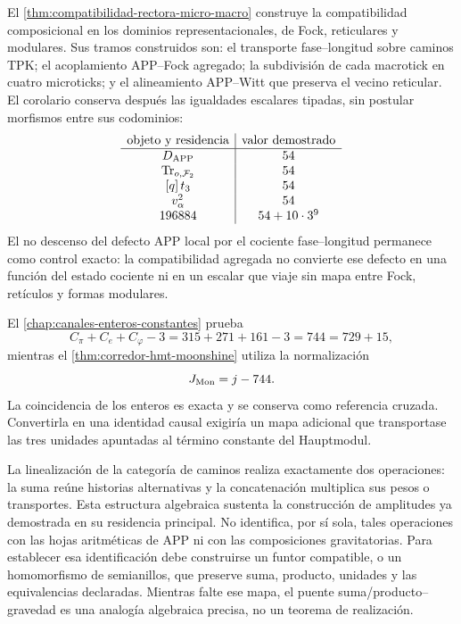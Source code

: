 El \cref{thm:compatibilidad-rectora-micro-macro} construye la compatibilidad
composicional en los dominios representacionales, de Fock, reticulares y
modulares. Sus tramos construidos son: el transporte fase--longitud sobre
caminos TPK; el acoplamiento APP--Fock agregado; la subdivisión de cada
macrotick en cuatro microticks; y el alineamiento APP--Witt que preserva el
vecino reticular. El corolario conserva después las igualdades escalares
tipadas, sin postular morfismos entre sus codominios:
\[
\begin{array}{c|c}
\text{objeto y residencia}&\text{valor demostrado}\\ \hline
D_{\rm APP}&54\\
\operatorname{Tr}_{o,\mathcal F_2}&54\\
\lbrack q\rbrack\,t_3&54\\
v_\alpha^2&54\\
196884&54+10\cdot3^9
\end{array}
\]
El no descenso del defecto APP local por el cociente fase--longitud permanece
como control exacto: la compatibilidad agregada no convierte ese defecto en
una función del estado cociente ni en un escalar que viaje sin mapa entre
Fock, retículos y formas modulares.

\begin{remark}[Normalización \(744\)]
El \cref{chap:canales-enteros-constantes} prueba
\[
 C_\pi+C_e+C_\varphi-3
 =315+271+161-3
 =744
 =729+15,
\]
mientras el \cref{thm:corredor-hmt-moonshine} utiliza la normalización
\[
 J_{\rm Mon}=j-744.
\]
La coincidencia de los enteros es exacta y se conserva como referencia
cruzada. Convertirla en una identidad causal exigiría un mapa adicional que
transportase las tres unidades apuntadas al término constante del
Hauptmodul.
\end{remark}

\begin{remark}
La linealización de la categoría de caminos realiza exactamente dos
operaciones: la suma reúne historias alternativas y la concatenación
multiplica sus pesos o transportes. Esta estructura algebraica sustenta la
construcción de amplitudes ya demostrada en su residencia principal. No
identifica, por sí sola, tales operaciones con las hojas aritméticas de APP
ni con las composiciones gravitatorias. Para establecer esa identificación
debe construirse un funtor compatible, o un homomorfismo de semianillos, que
preserve suma, producto, unidades y las equivalencias declaradas. Mientras
falte ese mapa, el puente suma/producto--gravedad es una analogía algebraica
precisa, no un teorema de realización.
\end{remark}


